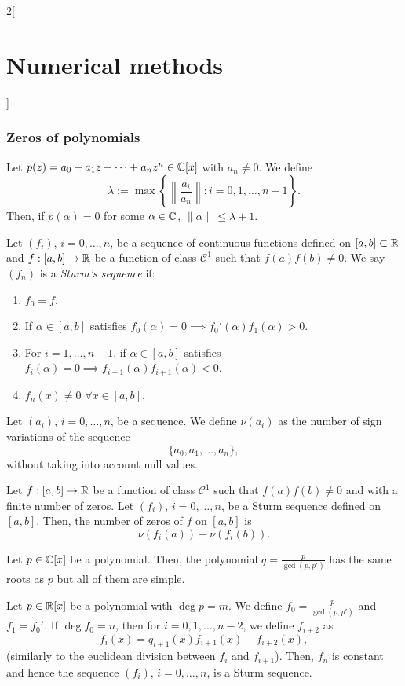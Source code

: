 \documentclass[../../../main.tex]{subfiles}
\begin{document}
\begin{multicols}{2}[\section{Numerical methods}]
\subsubsection*{Zeros of polynomials}
\begin{lemma}
    Let $p(z)=a_0+a_1z+\cdots+a_nz^n\in\mathbb{C} [x]$ with $a_n\ne 0$. We define $$\lambda:=\max\left\{\left\|\frac{a_i}{a_n}\right\|:i=0,1,\ldots,n-1\right\}.$$ Then, if $p(\alpha)=0$ for some $\alpha\in\mathbb{C} $, $\|\alpha\|\leq\lambda+1$.
\end{lemma}
\begin{definition}
    Let $(f_i)$, $i=0,\ldots,n$, be a sequence of continuous functions defined on $[a,b]\subset\mathbb{R}$ and $f:[a,b]\rightarrow\mathbb{R}$ be a function of class $\mathcal{C}^1$ such that $f(a)f(b)\ne 0$. We say $(f_n)$ is a \textit{Sturm's sequence} if:
    \begin{enumerate}
        \item $f_0=f$.
        \item If $\alpha\in[a,b]$ satisfies $f_0(\alpha)=0\implies f_0'(\alpha)f_1(\alpha)>0$.
        \item For $i=1,\ldots,n-1$, if $\alpha\in[a,b]$ satisfies $f_i(\alpha)=0\implies f_{i-1}(\alpha)f_{i+1}(\alpha)<0$.
        \item $f_n(x)\ne0$ $\forall x\in[a,b]$.
    \end{enumerate}
\end{definition}
\begin{definition}
    Let $(a_i)$, $i=0,\ldots,n$, be a sequence. We define $\nu(a_i)$ as the number of sign variations of the sequence $$\{a_0,a_1,\ldots,a_n\},$$ without taking into account null values. 
\end{definition}
\begin{theorem}
    Let $f:[a,b]\rightarrow\mathbb{R}$ be a function of class $\mathcal{C}^1$ such that $f(a)f(b)\ne 0$ and with a finite number of zeros. Let $(f_i)$, $i=0,\ldots,n$, be a Sturm sequence defined on $[a,b]$. Then, the number of zeros of $f$ on $[a,b]$ is $$\nu\left(f_i(a)\right)-\nu\left(f_i(b)\right).$$
\end{theorem}
\begin{lemma}
    Let $p\in\mathbb{C} [x]$ be a polynomial. Then, the polynomial $\displaystyle q=\frac{p}{\gcd(p,p')}$ has the same roots as $p$ but all of them are simple.
\end{lemma}
\begin{prop}
    Let $p\in\mathbb{R}[x]$ be a polynomial with $\deg p=m$. We define $\displaystyle f_0=\frac{p}{\gcd(p,p')}$ and $f_1=f_0'$. If $\deg f_0=n$, then for $i=0,1,\ldots,n-2$, we define $f_{i+2}$ as $$f_i(x)=q_{i+1}(x)f_{i+1}(x)-f_{i+2}(x),$$ (similarly to the euclidean division between $f_i$ and $f_{i+1}$). Then, $f_n$ is constant and hence the sequence $(f_i)$, $i=0,\ldots,n$, is a Sturm sequence.

\end{prop}
\end{multicols}
\end{document}
